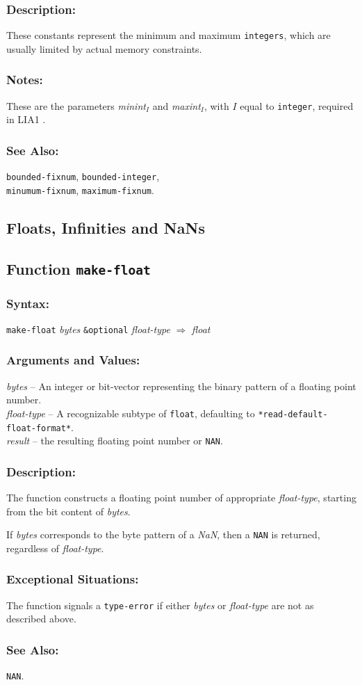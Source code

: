 \documentclass[10pt,fleqn]{article}
\newcommand{\code}[1]{\texttt{#1}}
\newcommand{\varname}[1]{\textit{#1}}
\newcommand{\DDictionaryItem}[1]{\vspace*{6pt}\noindent\hrulefill\vspace*{-9pt}\subsection*{#1}}
\newcommand{\DSyntax}{\subsubsection*{Syntax:}}
\newcommand{\DArgsNValues}{\subsubsection*{Arguments and Values:}}
\newcommand{\DDescription}{\subsubsection*{Description:}}
\newcommand{\DExceptional}{\subsubsection*{Exceptional Situations:}}
\newcommand{\DNotes}{\subsubsection*{Notes:}}
\newcommand{\DSeeAlso}{\subsubsection*{See Also:}}
\begin{document}
\DDescription{}

These constants represent the minimum and maximum \code{integers},
which are usually limited by actual memory constraints.

\DNotes{}

These are the parameters \textit{minint}$_I$ and \textit{maxint}$_I$,
with $I$ equal to \code{integer}, required in LIA1 \cite{2012:LIA1}.

\DSeeAlso{}

\code{bounded-fixnum},
\code{bounded-integer},\\
%
\code{minumum-fixnum},
\code{maximum-fixnum}.

\newpage

\subsection{Floats, Infinities and NaNs}


\DDictionaryItem{Function \code{make-float}}
\index{M!\code{make-float}}

\DSyntax{}

\code{make-float} \varname{bytes} \code{\&optional}
\varname{float-type}
$\Rightarrow$ \varname{float}

\DArgsNValues{}

\varname{bytes} -- An integer or bit-vector representing the binary
pattern of a floating point number.\\
\varname{float-type} -- A recognizable subtype of \code{float},
defaulting to \code{*read-default-float-format*}.\\
\varname{result} -- the resulting floating point number or \code{NAN}.


\DDescription{}

The function constructs a floating point number of appropriate
\varname{float-type}, starting from the bit content of
\varname{bytes}.

If \varname{bytes} corresponds to the byte pattern of a \emph{NaN},
then a \code{NAN} is returned, regardless of \varname{float-type}.

\DExceptional{}

The function signals a \code{type-error} if either \varname{bytes} or
\varname{float-type} are not as described above.

\DSeeAlso{}

\code{NAN}.
\end{document}
